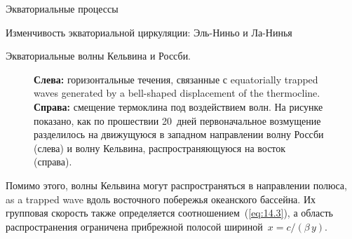 \begin{chapter}{Экваториальные процессы}
\begin{section}{Изменчивость экваториальной циркуляции: Эль-Ниньо и Ла-Нинья}
\begin{paragraph}{Экваториальные волны Кельвина и Россби.}
\begin{figure}[t!]
\caption{\textbf{Слева:} горизонтальные течения, связанные с
equatorially trapped waves generated by a bell-shaped
displacement of the thermocline.
\textbf{Справа:} смещение термоклина под 
воздействием волн. На рисунке показано, как по прошествии 20~дней 
первоначальное возмущение разделилось на движущуюся в западном направлении
волну Россби (слева) и волну Кельвина,
распространяющуюся на восток (справа).~\cite[стр.~120]{Philander:1984}}
\label{fig:rossbycurrents}
\end{figure}
%
%

Помимо этого, волны Кельвина могут распространяться в направлении полюса,
as a trapped wave вдоль восточного побережья океанского бассейна. 
Их групповая скорость также определяется соотношением~(\ref{eq:14.3}), 
а область распространения ограничена прибрежной полосой 
шириной~$x=c/\left(\beta\,y\right)$.
%


\end{paragraph}
\end{section}
\end{chapter}
